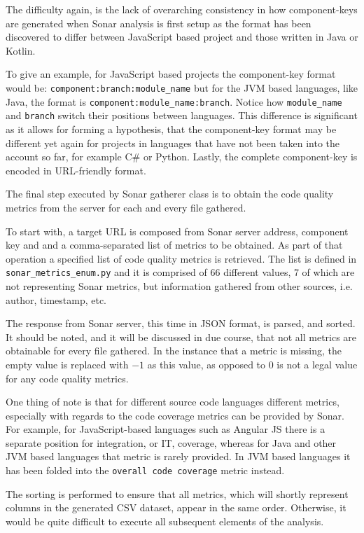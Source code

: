 The difficulty again, is the lack of overarching consistency in how component-keys are generated when Sonar analysis is first setup as the format has been discovered to differ between JavaScript based project and those written in Java or Kotlin.

To give an example, for JavaScript based projects the component-key format would be:
\texttt{component:branch:module\_name} but for the JVM based languages, like Java, the format is
\texttt{component:module\_name:branch}.
Notice how \texttt{module\_name} and \texttt{branch} switch their positions between languages.
This difference is significant as it allows for forming a hypothesis, that the component-key format may be different yet again for projects in languages that have not been taken into the account so far, for example C\# or Python.
Lastly, the complete component-key is encoded in URL-friendly format.

The final step executed by Sonar gatherer class is to obtain the code quality metrics from the server for each and every file gathered. 

To start with, a target URL is composed from Sonar server address, component key and and a comma-separated list of metrics to be obtained. As part of that operation a specified list of code quality metrics is retrieved. The list is defined in \texttt{sonar\_metrics\_enum.py} and it is comprised of 66 different values, 7 of which are not representing Sonar metrics, but information gathered from other sources, i.e. author, timestamp, etc. 

The response from Sonar server, this time in JSON format, is parsed, and sorted. It should be noted, and it will be discussed in due course, that not all metrics are obtainable for every file gathered. In the instance that a metric is missing, the empty value is replaced with $-1$ as this value, as opposed to $0$ is not a legal value for any code quality metrics. 

One thing of note is that for different source code languages different metrics, especially with regards to the code coverage metrics can be provided by Sonar. For example, for JavaScript-based languages such as Angular JS there is a separate position for integration, or IT, coverage, whereas for Java and other JVM based languages that metric is rarely provided. In JVM based languages it has been folded into the \texttt{overall code coverage} metric instead.

The sorting is performed to ensure that all metrics, which will shortly represent columns in the generated CSV dataset, appear in the same order. Otherwise, it would be quite difficult to execute all subsequent elements of the analysis.

